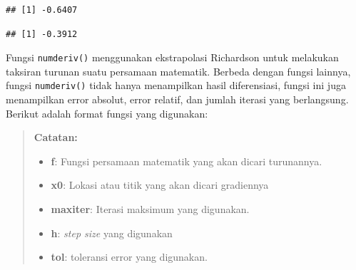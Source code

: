 \documentclass[
]{book}
\newenvironment{Shaded}{\begin{snugshade}}{\end{snugshade}}
\newcommand{\AttributeTok}[1]{\textcolor[rgb]{0.13,0.29,0.53}{#1}}
\newcommand{\CommentTok}[1]{\textcolor[rgb]{0.56,0.35,0.01}{\textit{#1}}}
\newcommand{\ControlFlowTok}[1]{\textcolor[rgb]{0.13,0.29,0.53}{\textbf{#1}}}
\newcommand{\DecValTok}[1]{\textcolor[rgb]{0.00,0.00,0.81}{#1}}
\newcommand{\FunctionTok}[1]{\textcolor[rgb]{0.13,0.29,0.53}{\textbf{#1}}}
\newcommand{\NormalTok}[1]{#1}
\newcommand{\SpecialCharTok}[1]{\textcolor[rgb]{0.81,0.36,0.00}{\textbf{#1}}}
\newcommand{\StringTok}[1]{\textcolor[rgb]{0.31,0.60,0.02}{#1}}
\providecommand{\tightlist}{%
  \setlength{\itemsep}{0pt}\setlength{\parskip}{0pt}}
\theoremstyle{definition}
\theoremstyle{definition}
\theoremstyle{definition}
\theoremstyle{definition}
\theoremstyle{remark}
\begin{document}
\begin{verbatim}
## [1] -0.6407
\end{verbatim}

\begin{Shaded}
\end{Shaded}

\begin{verbatim}
## [1] -0.3912
\end{verbatim}

Fungsi \texttt{numderiv()} menggunakan ekstrapolasi Richardson untuk melakukan taksiran turunan suatu persamaan matematik. Berbeda dengan fungsi lainnya, fungsi \texttt{numderiv()} tidak hanya menampilkan hasil diferensiasi, fungsi ini juga menampilkan error absolut, error relatif, dan jumlah iterasi yang berlangsung. Berikut adalah format fungsi yang digunakan:

\begin{Shaded}
\end{Shaded}

\begin{quote}
\textbf{Catatan:}

\begin{itemize}
\tightlist
\item
  \textbf{f}: Fungsi persamaan matematik yang akan dicari turunannya.
\item
  \textbf{x0}: Lokasi atau titik yang akan dicari gradiennya
\item
  \textbf{maxiter}: Iterasi maksimum yang digunakan.
\item
  \textbf{h}: \emph{step size} yang digunakan
\item
  \textbf{tol}: toleransi error yang digunakan.
\end{itemize}
\end{quote}
\end{document}
